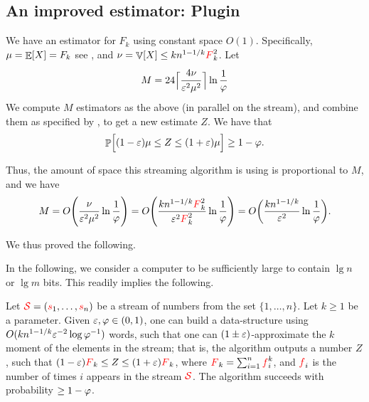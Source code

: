 \subsection{An improved estimator: Plugin}

We have an estimator for $F_k$ using constant space
$O(1)$. Specifically, $\mu = \mathop{\mathbb{E}}\!\left[ {X} \right] = F_k$ see , and
$\nu = \mathop{\mathbb{V}}\!\left[ {X} \right] \leq k n^{1-1/k} {\textcolor{red}{F}}_k^2$. Let
\begin{equation*}
    M = 24 \Bigl\lceil{ \frac{4 \nu\bigr.}{{\varepsilon}^2\mu^2\bigr.}  }
    \Bigr\rceil \ln \frac{1}{\varphi}    
\end{equation*}
We compute $M$ estimators as the above (in parallel on the stream),
and combine them as specified by , to get a
new estimate $Z$. We have that
\begin{equation*}
    \Prob{ (1-\eps)\mu \leq Z \leq (1+\eps)\mu \Bigr.} \geq 1 -
    \BadProb.
\end{equation*}

Thus, the amount of space this streaming algorithm is using is
proportional to $M$, and we have
\begin{equation*}
    M
    =
    O\pth{\frac{ \nu\bigr.}{\eps^2\mu^2\bigr.}  
       \ln \frac{1}{\BadProb}  }    
    =%
    O\pth{\frac{ k n^{1-1/k} \Frq_k^2 }{\eps^2\Frq_k^2\bigr.}  
       \ln \frac{1}{\BadProb}  }    
    =%
    O\pth{\frac{ k n^{1-1/k} }{\eps^2}  
       \ln \frac{1}{\BadProb}  }.    
\end{equation*}



We thus proved the following.


In the following, we consider a computer  to be
sufficiently large to contain $\lg n$ or $\lg m$ bits. This readily
implies the following.
\begin{theorem}
    Let ${\textcolor{red}{\mathcal{S}}}=({\textcolor{red}{{s}}}_1, \ldots, {\textcolor{red}{{s}}}_n)$ be a stream of numbers from
    the set $\{1,\ldots, n\}$. Let $k \geq 1$ be a parameter. Given
    ${\varepsilon}, \varphi \in (0,1)$, one can build a data-structure using
    $O( kn^{1-1/k}{\varepsilon}^{-2} \log \varphi^{-1})$ words, such that one
    can $(1\pm {\varepsilon})$-approximate the $k$\th moment of the elements in
    the stream; that is, the algorithm outputs a number $Z$, such that
    $(1-{\varepsilon}){\textcolor{red}{F}}_k \leq Z \leq (1+{\varepsilon}){\textcolor{red}{F}}_k$, where
    ${\textcolor{red}{F}}_k = \sum_{i=1}^n {\textcolor{red}{f}}_i^k$, and ${\textcolor{red}{f}}_i$ is the number of
    times $i$ appears in the stream ${\textcolor{red}{\mathcal{S}}}$. The algorithm succeeds
    with probability $\geq 1- \varphi$.
\end{theorem}

